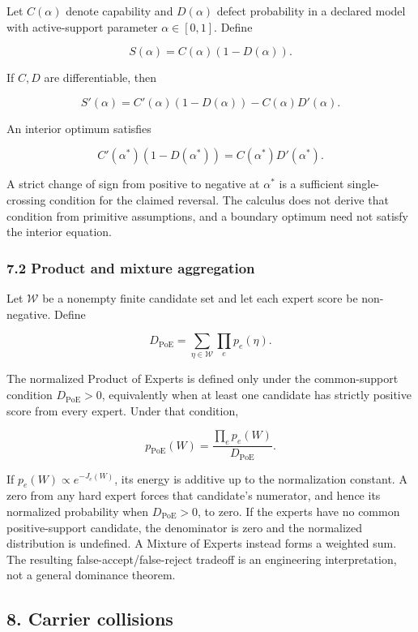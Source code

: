 \documentclass[
  11pt,
]{article}
\theoremstyle{plain}
\theoremstyle{definition}\newtheorem{definition}[theorem]{Definition}
\theoremstyle{remark}\newtheorem*{remark}{Remark}
\begin{document}
Let \(C(\alpha)\) denote capability and \(D(\alpha)\) defect probability in a
declared model with active-support parameter \(\alpha\in[0,1]\). Define

\[
S(\alpha)=C(\alpha)(1-D(\alpha)).
\]

If \(C,D\) are differentiable, then

\[
S'(\alpha)=C'(\alpha)(1-D(\alpha))-C(\alpha)D'(\alpha).
\]

An interior optimum satisfies

\[
C'(\alpha^\ast)(1-D(\alpha^\ast))
=C(\alpha^\ast)D'(\alpha^\ast).
\]

A strict change of sign from positive to negative at \(\alpha^\ast\) is a
sufficient single-crossing condition for the claimed reversal. The calculus
does not derive that condition from primitive assumptions, and a boundary
optimum need not satisfy the interior equation.

\subsubsection{7.2 Product and mixture aggregation}\label{product-and-mixture-aggregation}

Let \(\mathcal W\) be a nonempty finite candidate set and let each expert score
be non-negative. Define

\[
D_{\mathrm{PoE}}=\sum_{\eta\in\mathcal W}\prod_e p_e(\eta).
\]

The normalized Product of Experts is defined only under the common-support
condition \(D_{\mathrm{PoE}}>0\), equivalently when at least one candidate has
strictly positive score from every expert. Under that condition,

\[
p_{\mathrm{PoE}}(W)
=\frac{\prod_e p_e(W)}
       {D_{\mathrm{PoE}}}.
\]

If \(p_e(W)\propto e^{-J_e(W)}\), its energy is additive up to the
normalization constant. A zero from any hard expert forces that candidate's
numerator, and hence its normalized probability when
\(D_{\mathrm{PoE}}>0\), to zero. If the experts have no common positive-support
candidate, the denominator is zero and the normalized distribution is
undefined. A Mixture of Experts instead forms a weighted sum. The resulting
false-accept/false-reject tradeoff is an engineering interpretation, not a
general dominance theorem.

\subsection{8. Carrier collisions}\label{carrier-collisions}
\end{document}
